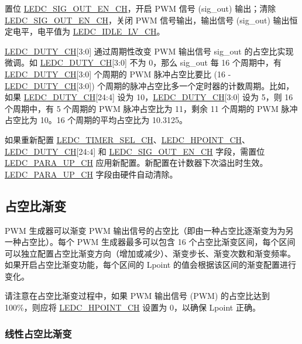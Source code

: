 \documentclass[main\_\_CN.tex]{subfiles}
\begin{document}
置位 \hyperref[fielddesc:LEDCSIGOUTENCHN]{LEDC\_SIG\_OUT\_EN\_CH}，开启 PWM 信号 (sig\_out) 输出；清除 \hyperref[fielddesc:LEDCSIGOUTENCHN]{LEDC\_SIG\_OUT\_EN\_CH}，关闭 PWM 信号输出，输出信号 (sig\_out) 输出恒定电平，电平值为 \hyperref[fielddesc:LEDCIDLELVCHN]{LEDC\_IDLE\_LV\_CH}。

\hyperref[fielddesc:LEDCDUTYCHN]{LEDC\_DUTY\_CH}[3:0] 通过周期性改变 PWM 输出信号 sig\_out 的占空比实现微调。如 \hyperref[fielddesc:LEDCDUTYCHN]{LEDC\_DUTY\_CH}[3:0] 不为 0，那么 sig\_out 每 16 个周期中，有 \hyperref[fielddesc:LEDCDUTYCHN]{LEDC\_DUTY\_CH}[3:0] 个周期的 PWM 脉冲占空比要比 (16 - \hyperref[fielddesc:LEDCDUTYCHN]{LEDC\_DUTY\_CH}[3:0]) 个周期的脉冲占空比多一个定时器的计数周期。比如，如果 \hyperref[fielddesc:LEDCDUTYCHN]{LEDC\_DUTY\_CH}[24:4] 设为 10，\hyperref[fielddesc:LEDCDUTYCHN]{LEDC\_DUTY\_CH}[3:0] 设为 5，则 16 个周期中，有 5 个周期的 PWM 脉冲占空比为 11，剩余 11 个周期的 PWM 脉冲占空比为 10。16 个周期的平均占空比为 10.3125。

如果重新配置 \hyperref[fielddesc:LEDCTIMERSELCHN]{LEDC\_TIMER\_SEL\_CH}、\hyperref[fielddesc:LEDCHPOINTCHN]{LEDC\_HPOINT\_CH}、\hyperref[fielddesc:LEDCDUTYCHN]{LEDC\_DUTY\_CH}[24:4] 和 \hyperref[fielddesc:LEDCSIGOUTENCHN]{LEDC\_SIG\_OUT\_EN\_CH} 字段，需置位 \hyperref[fielddesc:LEDCPARAUPCHN]{LEDC\_PARA\_UP\_CH} 应用新配置。新配置在计数器下次溢出时生效。\hyperref[fielddesc:LEDCPARAUPCHN]{LEDC\_PARA\_UP\_CH} 字段由硬件自动清除。

\subsection{占空比渐变}

PWM 生成器可以渐变 PWM 输出信号的占空比（即由一种占空比逐渐变为为另一种占空比）。每个 PWM 生成器最多可以包含 16 个占空比渐变区间，每个区间可以独立配置占空比渐变方向（增加或减少）、渐变步长、渐变次数和渐变频率。如果开启占空比渐变功能，每个区间的 Lpoint 的值会根据该区间的渐变配置进行变化。

请注意在占空比渐变过程中，如果 PWM 输出信号 (PWM) 的占空比达到 100\%，则应将 \hyperref[fielddesc:LEDCHPOINTCHN]{LEDC\_HPOINT\_CH} 设置为 0，以确保 Lpoint 正确。

\subsubsection{线性占空比渐变}
\label{sec:ledc-pwm-linear-duty-cycle-fading}
\end{document}
